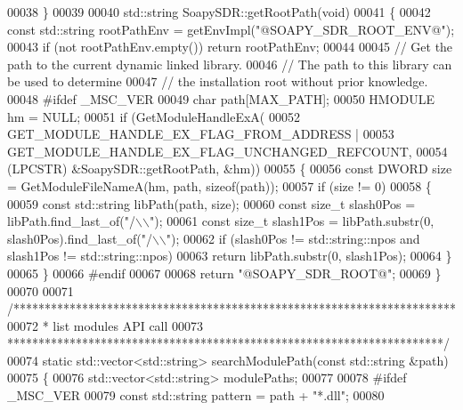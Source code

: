 \begin{DoxyCode}
00038 \}
00039 
00040 std::string SoapySDR::getRootPath(\textcolor{keywordtype}{void})
00041 \{
00042     \textcolor{keyword}{const} std::string rootPathEnv = getEnvImpl(\textcolor{stringliteral}{"@SOAPY\_SDR\_ROOT\_ENV@"});
00043     \textcolor{keywordflow}{if} (not rootPathEnv.empty()) \textcolor{keywordflow}{return} rootPathEnv;
00044 
00045     \textcolor{comment}{// Get the path to the current dynamic linked library.}
00046     \textcolor{comment}{// The path to this library can be used to determine}
00047     \textcolor{comment}{// the installation root without prior knowledge.}
00048 \textcolor{preprocessor}{    #ifdef \_MSC\_VER}
00049     \textcolor{keywordtype}{char} path[MAX\_PATH];
00050     HMODULE hm = NULL;
00051     \textcolor{keywordflow}{if} (GetModuleHandleExA(
00052         GET\_MODULE\_HANDLE\_EX\_FLAG\_FROM\_ADDRESS |
00053         GET\_MODULE\_HANDLE\_EX\_FLAG\_UNCHANGED\_REFCOUNT,
00054         (LPCSTR) &SoapySDR::getRootPath, &hm))
00055     \{
00056         \textcolor{keyword}{const} DWORD size = GetModuleFileNameA(hm, path, \textcolor{keyword}{sizeof}(path));
00057         \textcolor{keywordflow}{if} (size != 0)
00058         \{
00059             \textcolor{keyword}{const} std::string libPath(path, size);
00060             \textcolor{keyword}{const} \textcolor{keywordtype}{size\_t} slash0Pos = libPath.find\_last\_of(\textcolor{stringliteral}{"/\(\backslash\)\(\backslash\)"});
00061             \textcolor{keyword}{const} \textcolor{keywordtype}{size\_t} slash1Pos = libPath.substr(0, slash0Pos).find\_last\_of(\textcolor{stringliteral}{"/\(\backslash\)\(\backslash\)"});
00062             \textcolor{keywordflow}{if} (slash0Pos != std::string::npos and slash1Pos != std::string::npos)
00063                 \textcolor{keywordflow}{return} libPath.substr(0, slash1Pos);
00064         \}
00065     \}
00066 \textcolor{preprocessor}{    #endif}
00067 
00068     \textcolor{keywordflow}{return} \textcolor{stringliteral}{"@SOAPY\_SDR\_ROOT@"};
00069 \}
00070 
00071 \textcolor{comment}{/***********************************************************************}
00072 \textcolor{comment}{ * list modules API call}
00073 \textcolor{comment}{ **********************************************************************/}
00074 \textcolor{keyword}{static} std::vector<std::string> searchModulePath(\textcolor{keyword}{const} std::string &path)
00075 \{
00076     std::vector<std::string> modulePaths;
00077 
00078 \textcolor{preprocessor}{#ifdef \_MSC\_VER}
00079     \textcolor{keyword}{const} std::string pattern = path + \textcolor{stringliteral}{"*.dll"};
00080 

\end{DoxyCode}
